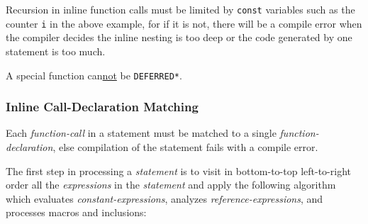 \documentclass[12pt]{article}
\begin{document}
Recursion in inline function calls must be limited by {\tt const}
variables such as the counter {\tt i} in the above example,
for if it is not, there
will be a compile error when the compiler decides the inline nesting
is too deep or the code generated by one statement is too much.

A special function can\underline{not} be {\tt *DEFERRED*}.

\subsubsection{Inline Call-Declaration Matching}
\label{INLINE-CALL-DECLARATION-MATCHING}

Each {\em function-call} in a statement must be matched to a single
{\em function-declaration}, else compilation of the statement fails
with a compile error.

The first step in processing
a {\em statement} is to visit in bottom-to-top left-to-right order
all the {\em expressions} in the {\em statement} and apply the following
algorithm which evaluates {\em constant-expressions}, analyzes
{\em reference-expressions}, and processes macros and inclusions:

\bigskip
\end{document}
